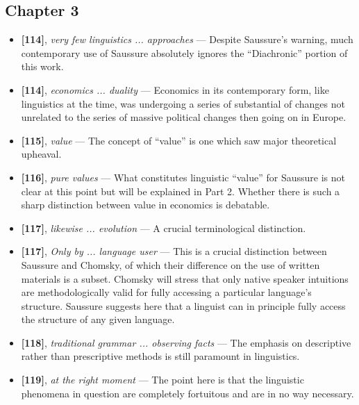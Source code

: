 \documentclass[12pt]{article}
\begin{document}
\subsection{Chapter 3}

\begin{itemize}

\item \textbf{[114]}, \textit{very few linguistics ... approaches} --- Despite Saussure's warning, much contemporary use of Saussure absolutely ignores the ``Diachronic'' portion of this work.

\item \textbf{[114]}, \textit{economics ... duality} --- Economics in its contemporary form, like linguistics at the time, was undergoing a series of substantial of changes not unrelated to the series of massive political changes then going on in Europe.

\item \textbf{[115]}, \textit{value} --- The concept of ``value'' is one which saw major theoretical upheaval.

\item \textbf{[116]}, \textit{pure values} --- What constitutes linguistic ``value'' for Saussure is not clear at this point but will be explained in Part 2. Whether there is such a sharp distinction between value in economics is debatable.

\item \textbf{[117]}, \textit{likewise ... evolution} --- A crucial terminological distinction.

\item \textbf{[117]}, \textit{Only by ... language user} --- This is a crucial distinction between Saussure and Chomsky, of which their difference on the use of written materials is a subset. Chomsky will stress that only native speaker intuitions are methodologically valid for fully accessing a particular language's structure. Saussure suggests here that a linguist can in principle fully access the structure of any given language.

\item \textbf{[118]}, \textit{traditional grammar ... observing facts} --- The emphasis on descriptive rather than prescriptive methods is still paramount in linguistics.

\item \textbf{[119]}, \textit{at the right moment} --- The point here is that the linguistic phenomena in question are completely fortuitous and are in no way necessary.


\end{itemize}
\end{document}
